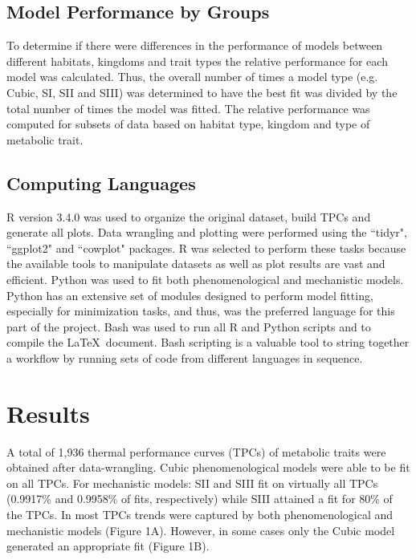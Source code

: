 \documentclass[11pt]{article}  %
\begin{document}
\subsection*{Model Performance by Groups}

To determine if there were differences in the performance of models between different habitats, kingdoms and trait types the relative performance for each model was calculated. Thus, the overall number of times a model type (e.g. Cubic, SI, SII and SIII) was determined to have the best fit was divided by the total number of times the model was fitted. The relative performance was computed for subsets of data based on habitat type, kingdom and type of metabolic trait. 

\subsection*{Computing Languages }

R version 3.4.0 was used to organize the original dataset, build TPCs and generate all plots. Data wrangling and plotting were performed using the ``tidyr", ``ggplot2" and ``cowplot" packages. R was selected to perform these tasks because the available tools to manipulate datasets as well as plot results are vast and efficient. Python was used to fit both phenomenological and mechanistic models. Python has an extensive set of modules designed to perform model fitting, especially for minimization tasks, and thus, was the preferred language for this part of the project. Bash was used to run all R and Python scripts and to compile the \LaTeX\ document. Bash scripting is a valuable tool to string together a workflow by running sets of code from different languages in sequence.



\section*{Results}

A total of 1,936 thermal performance curves (TPCs) of metabolic traits were obtained after data-wrangling. Cubic phenomenological models were able to be fit on all TPCs. For mechanistic models: SII and SIII fit on virtually all TPCs (0.9917\% and 0.9958\% of fits, respectively) while SIII attained a fit for 80\% of the TPCs. In most TPCs trends were captured by both phenomenological and mechanistic models (Figure 1A). However, in some cases only the Cubic model generated an appropriate fit (Figure 1B).
\end{document}
